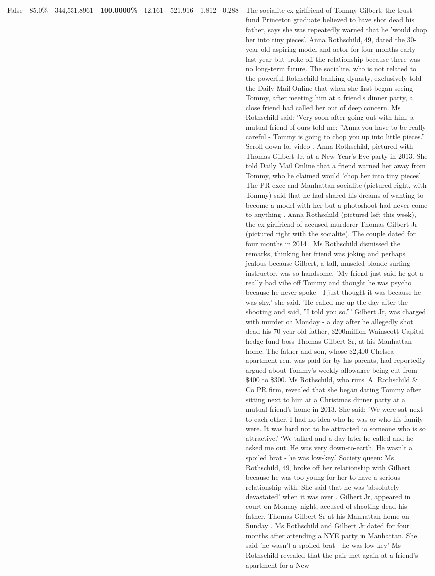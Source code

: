 \begin{table}[H]
\begin{tabular}{lllrlllll}
False & 85.0\% & 344,551.8961 & \bfseries \color{red} 100.0000\% & 12.161 & 521.916 & 1,812 & 0.288 & The socialite ex-girlfriend of Tommy Gilbert, the trust-fund Princeton graduate believed to have shot dead his father, says she was repeatedly warned that he 'would chop her into tiny pieces'. Anna Rothschild, 49, dated the 30-year-old aspiring model and actor for four months early last year but broke off the relationship because there was no long-term future. The socialite, who is not related to the powerful Rothschild banking dynasty, exclusively told the Daily Mail Online that when she first began seeing Tommy, after meeting him at a friend's dinner party, a close friend had called her out of deep concern. Ms Rothschild said: 'Very soon after going out with him, a mutual friend of ours told me: ''Anna you have to be really careful - Tommy is going to chop you up into little pieces.'' Scroll down for video . Anna Rothschild, pictured with Thomas Gilbert Jr, at a New Year's Eve party in 2013. She told Daily Mail Online that a friend warned her away from Tommy, who he claimed would 'chop her into tiny pieces' The PR exec and Manhattan socialite (pictured right, with Tommy) said that he had shared his dreams of wanting to become a model with her but a photoshoot had never come to anything . Anna Rothschild (pictured left this week), the ex-girlfriend of accused murderer Thomas Gilbert Jr (pictured right with the socialite). The couple dated for four months in 2014 . Ms Rothschild dismissed the remarks, thinking her friend was joking and perhaps jealous because Gilbert, a tall, muscled blonde surfing instructor, was so handsome. 'My friend just said he got a really bad vibe off Tommy and thought he was psycho because he never spoke - I just thought it was because he was shy,' she said. 'He called me up the day after the shooting and said, ''I told you so.''' Gilbert Jr, was charged with murder on Monday - a day after he allegedly shot dead his 70-year-old father, \$200million Wainscott Capital hedge-fund boss Thomas Gilbert Sr, at his Manhattan home. The father and son, whose \$2,400 Chelsea apartment rent was paid for by his parents, had reportedly argued about Tommy's weekly allowance being cut from \$400 to \$300. Ms Rothschild, who runs A. Rothschild \& Co PR firm, revealed that she began dating Tommy after sitting next to him at a Christmas dinner party at a mutual friend's home in 2013. She said: 'We were sat next to each other. I had no idea who he was or who his family were. It was hard not to be attracted to someone who is so attractive.' ‘We talked and a day later he called and he asked me out. He was very down-to-earth. He wasn’t a spoiled brat - he was low-key.’ Society queen: Ms Rothschild, 49, broke off her relationship with Gilbert because he was too young for her to have a serious relationship with. She said that he was 'absolutely devastated' when it was over . Gilbert Jr, appeared in court on Monday night, accused of shooting dead his father, Thomas Gilbert Sr at his Manhattan home on Sunday . Ms Rothschild and Gilbert Jr dated for four months after attending a NYE party in Manhattan. She said 'he wasn't a spoiled brat - he was low-key' Ms Rothschild revealed that the pair met again at a friend’s apartment for a New 
\end{tabular}
\end{table}
